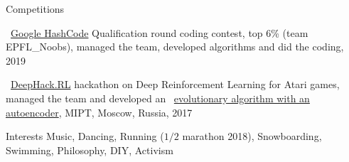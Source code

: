 \documentclass{resume} %
\newcommand*{\img}[1]{%
	\raisebox{-.02\baselineskip}{%
		\texttt{[image: \#1]}%
	}%
}
\newcommand*{\emoji}[1]{\img{./emoji/\imgpref#1.png}}
\newcommand*{\mybold}[1]{{\color{pinkunderline} #1}}
\def\imgpref{bleak-}
\newcommand{\mylink}{{\color{gray}\faExternalLink}}
\begin{document}
\begin{rSection}{Competitions}
\vspace{-1em}
\item \emoji{flag-ch} \mylink~\href{https://hashcodejudge.withgoogle.com/scoreboard}{Google HashCode} Qualification round coding contest, \mybold{top 6\%} (team EPFL\_Noobs), managed the team, developed algorithms and did the coding, 2019\vspace{1em}\\
\emoji{flag-ru}
\mylink~\href{http://web.archive.org/web/20170224094223/http://rl.deephack.me/}{DeepHack.RL} hackathon on Deep \mybold{Reinforcement} Learning for Atari games, managed the team and developed an \mylink~\href{https://github.com/sergeivolodin/deephack.rl}{evolutionary algorithm with an autoencoder}, MIPT, Moscow, Russia, 2017
\end{rSection}

\begin{rSection}{Interests}
	Music, Dancing, Running ($1/2$ marathon 2018), Snowboarding, Swimming, Philosophy, DIY, Activism
\end{rSection}
\end{document}

